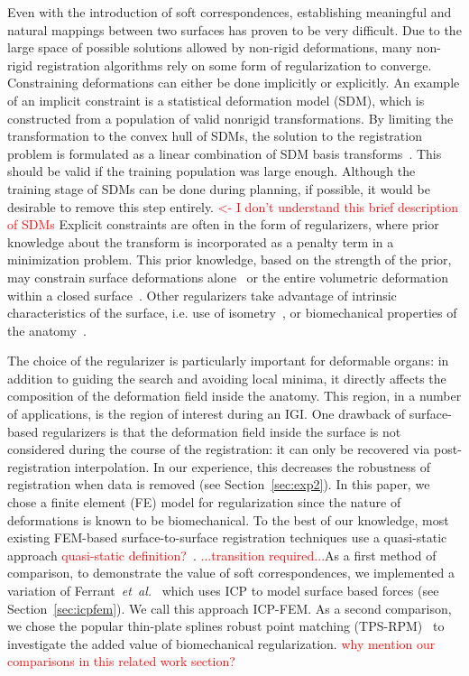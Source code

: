 \documentclass[journal]{IEEEtran}
\newcommand{\comment}[1]{\textcolor{red}{#1}}
\begin{document}
Even with the introduction of soft correspondences, establishing meaningful and natural mappings between two surfaces has proven to be very difficult.  Due to the large space of possible solutions allowed by non-rigid deformations, many non-rigid registration algorithms rely on some form of regularization to converge. Constraining deformations can either be done implicitly or explicitly. An example of an implicit constraint is a statistical deformation model (SDM), which is constructed from a population of valid nonrigid transformations. By limiting the transformation to the convex hull of SDMs, the solution to the registration problem is formulated as a linear combination of SDM basis transforms~\cite{Hu12a,Ashraf02a}.  This should be valid if the training population was large enough. Although the training stage of SDMs can be done during planning, if possible, it would be desirable to remove this step entirely. \comment{<- I don't understand this brief description of SDMs} Explicit constraints are often in the form of regularizers, where prior knowledge about the transform is incorporated as a penalty term in a minimization problem. This prior knowledge, based on the strength of the prior, may constrain surface deformations alone~\cite{Cerveri14a,Myronenko10a} or the entire volumetric deformation within a closed surface~\cite{Chui03a,Karnik10a}. Other regularizers take advantage of intrinsic characteristics of the surface, i.e. use of isometry~\cite{Huang08a,Sahillioglu12a,Zhang08a,Zheng10a}, or biomechanical properties of the anatomy~\cite{Cash05a,Ferrant01a,Moradi12a,Noe10a,Rucker14a,Farheen12a}.

The choice of the regularizer is particularly important for deformable organs: in addition to guiding the search and avoiding local minima, it directly affects the composition of the deformation field inside the anatomy. This region, in a number of applications, is the region of interest during an IGI. One drawback of surface-based regularizers is that the deformation field inside the surface is not considered during the course of the registration: it can only be recovered via post-registration interpolation. In our experience, this decreases the robustness of registration when data is removed (see Section~\ref{sec:exp2}). In this paper, we chose a finite element (FE) model for regularization since the nature of deformations is known to be biomechanical. To the best of our knowledge, most existing FEM-based surface-to-surface registration techniques use a quasi-static approach \comment{quasi-static definition?}~\cite{Cash05a,Ferrant01a,Moradi12a,Noe10a,Rucker14a}. \comment{...transition required...}As a first method of comparison, to demonstrate the value of soft correspondences, we implemented a variation of Ferrant~\textit{et~al.}~\cite{Ferrant01a} which uses ICP to model surface based forces (see Section~\ref{sec:icpfem}). We call this approach ICP-FEM. As a second comparison, we chose the popular thin-plate splines robust point matching (TPS-RPM)~\cite{Chui03a} to investigate the added value of biomechanical regularization. \comment{why mention our comparisons in this related work section?}
\end{document}
